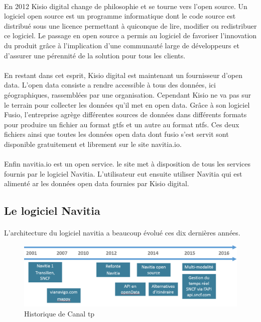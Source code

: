 \documentclass[a4paper]{report}
\begin{document}
\paragraph{} En 2012 Kisio digital change de philosophie et se tourne vers l'open source. Un logiciel open source est un programme informatique dont le code source est distribué sous une licence permettant à quiconque de lire, modifier ou redistribuer ce logiciel. Le passage en open source a permis au logiciel de favoriser l’innovation du produit grâce à l’implication d’une communauté large de développeurs et d'assurer une pérennité de la solution pour tous les clients. 

\paragraph{} En restant dans cet esprit, Kisio digital est maintenant un fournisseur d'open data. L'open data consiste a rendre accessible à tous des données, ici géographiques, rassemblées par une organisation. Cependant Kisio ne va pas sur le terrain pour collecter les données qu'il met en open data. Grâce à son logiciel Fusio, l'entreprise agrège différentes sources de données dans différents formats pour produire un fichier au format gtfs et un autre au format ntfs. Ces deux fichiers ainsi que toutes les données open data dont fusio s'est servit sont disponible gratuitement et librement sur le site navitia.io.

\paragraph{} Enfin navitia.io est un open service. le site met à disposition de tous les services fournis par le logiciel Navitia. L'utilisateur eut ensuite utiliser Navitia qui est alimenté ar les données open data fournies par Kisio digital. 

\subsection{Le logiciel Navitia}

\paragraph{} L'architecture du logiciel navitia a beaucoup évolué ces dix dernières années.

\begin{figure}[H]
	\begin{center}
		\includegraphics[width=400pt]{image/historique_navitia}
		\caption{Historique de Canal tp}
		\label{Historique de Canal tp}
	\end{center}
\end{figure}
\end{document}
